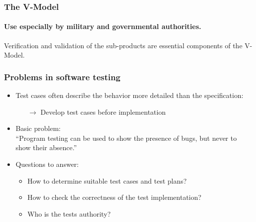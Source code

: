 
\begin{frame}
\frametitle{The V-Model}
\framesubtitle{Use especially by military and governmental authorities.}
\begin{center}
\end{center}
Verification and validation of the sub-products are essential components of the V-Model.
\end{frame}


\begin{frame}
\frametitle{Problems in software testing}
\begin{itemize}
  \item Test cases often describe the behavior more detailed than the specification: 
    \begin{itemize}
      \item[$\rightarrow$] Develop test cases before implementation
    \end{itemize}
  \item Basic problem: \\
        ``Program testing can be used to show the presence of bugs, but never to show their absence.'' \citep{Dijkstra72}
  \item Questions to answer:
   \begin{itemize}
  	\item How to determine suitable test cases and test plans? 
    \item How to check the correctness of the test implementation? 
    \item Who is the tests authority? 
   \end{itemize}
\end{itemize}
\end{frame}



